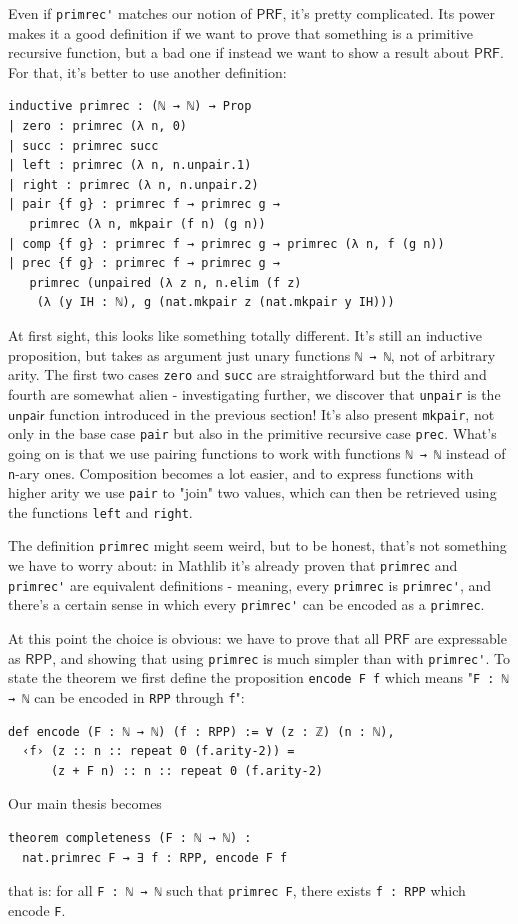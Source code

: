 \documentclass{book}
\theoremstyle{definition}
\theoremstyle{remark}
\theoremstyle{plain}
\newcommand{\RPP}{\mathsf{RPP}}
\newcommand{\rppunpair}{\mathsf{unpair}}
\newcommand{\PRF}{\mathsf{PRF}}
\begin{document}
Even if \lstinline{primrec'} matches our notion of $\PRF$, it's pretty complicated.
Its power makes it a good definition if we want to prove that something is a primitive recursive function,
but a bad one if instead we want to show a result about $\PRF$.
For that, it's better to use another definition:
\begin{lstlisting}
inductive primrec : (ℕ → ℕ) → Prop
| zero : primrec (λ n, 0)
| succ : primrec succ
| left : primrec (λ n, n.unpair.1)
| right : primrec (λ n, n.unpair.2)
| pair {f g} : primrec f → primrec g →
   primrec (λ n, mkpair (f n) (g n))
| comp {f g} : primrec f → primrec g → primrec (λ n, f (g n))
| prec {f g} : primrec f → primrec g →
   primrec (unpaired (λ z n, n.elim (f z)
    (λ (y IH : ℕ), g (nat.mkpair z (nat.mkpair y IH)))
\end{lstlisting}
At first sight, this looks like something totally different.
It's still an inductive proposition, but takes as argument just unary functions \lstinline{ℕ → ℕ}, not of arbitrary arity.
The first two cases \lstinline{zero} and \lstinline{succ} are straightforward but the third and fourth are somewhat alien -
investigating further, we discover that \lstinline{unpair} is the $\rppunpair$ function introduced in the previous section!
It's also present \lstinline{mkpair}, not only in the base case \lstinline{pair} but also in the primitive recursive case \lstinline{prec}.
What's going on is that we use pairing functions to work with functions \lstinline{ℕ → ℕ} instead of \lstinline{n}-ary ones.
Composition becomes a lot easier, and to express functions with higher arity we use \lstinline{pair} to "join" two values,
which can then be retrieved using the functions \lstinline{left} and \lstinline{right}.

The definition \lstinline{primrec} might seem weird, but to be honest, that's not something we have to worry about:
in Mathlib it's already proven that \lstinline{primrec} and \lstinline{primrec'} are equivalent definitions - meaning,
every \lstinline{primrec} is \lstinline{primrec'},
and there's a certain sense in which every \lstinline{primrec'} can be encoded as a \lstinline{primrec}.

At this point the choice is obvious: we have to prove that all $\PRF$ are expressable as $\RPP$,
and showing that using \lstinline{primrec} is much simpler than with \lstinline{primrec'}.
To state the theorem we first define the proposition \lstinline{encode F f} which means
"\lstinline{F : ℕ → ℕ} can be encoded in \lstinline{RPP} through \lstinline{f}":
\begin{lstlisting}
def encode (F : ℕ → ℕ) (f : RPP) := ∀ (z : ℤ) (n : ℕ),
  ‹f› (z :: n :: repeat 0 (f.arity-2)) =
      (z + F n) :: n :: repeat 0 (f.arity-2)
\end{lstlisting}
Our main thesis becomes
\begin{lstlisting}
theorem completeness (F : ℕ → ℕ) :
  nat.primrec F → ∃ f : RPP, encode F f
\end{lstlisting}
that is: for all \lstinline{F : ℕ → ℕ} such that \lstinline{primrec F},
there exists \lstinline{f : RPP} which encode \lstinline{F}.
\end{document}

